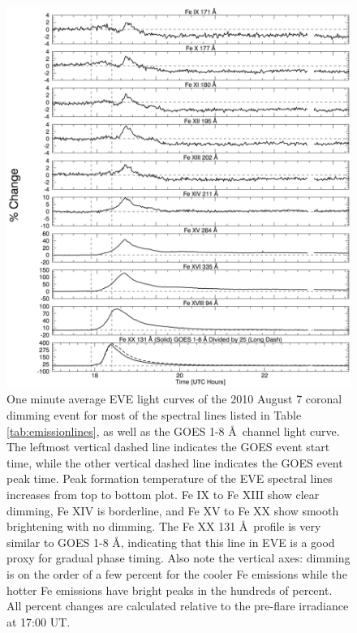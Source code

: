 \newpage
\begin{singlespace}
\begin{figure}[H]
    \begin{center}
	    \includegraphics[width=166mm]{Images/Eve2010Aug7.png}
    \end{center}
    \caption[EVE selected extracted emission lines for 2010 August 7 event]{ 
        One minute average EVE light curves of the 2010 August 7 coronal dimming event for most of the spectral lines listed 
        in Table \ref{tab:emissionlines}, as well as the GOES 1-8 \AA\ channel light curve. The leftmost vertical dashed 
        line indicates
        the GOES event start time, while the other vertical dashed line indicates the GOES event peak time. Peak formation 
        temperature of the EVE spectral lines increases from top to bottom plot. Fe IX to Fe XIII show clear dimming, Fe XIV
        is borderline, and Fe XV to Fe XX show smooth brightening with no dimming. The Fe XX 131 \AA\ profile is very 
        similar to GOES 1-8 \AA, indicating that this line in EVE is a good proxy for gradual phase timing. Also note the 
        vertical axes: dimming is on the order of a few percent for the cooler Fe emissions while the hotter Fe emissions 
        have bright peaks in the hundreds of percent. All percent changes are calculated relative to the pre-flare 
        irradiance at 17:00 UT.
    }
    \label{eve2010aug7}
\end{figure}
\end{singlespace}

